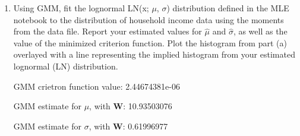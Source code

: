 \documentclass[letterpaper,12pt]{article}
\theoremstyle{definition}
\begin{document}
\begin{enumerate}
\begin{enumerate}
\item Using GMM, fit the lognormal LN(x; $\mu$, $\sigma$) distribution defined in the MLE notebook to the distribution of household income data using the moments from the data file. Report your estimated values for $\hat{\mu}$ and $\hat{\sigma}$, as well as the value of the minimized criterion function. Plot the histogram from part (a) overlayed with a line representing the implied histogram from your estimated lognormal (LN) distribution.
\par
\begin{figure}[H]\centering\captionsetup{width=4.0in}
\end{figure}
\par
GMM crietron function value: 2.44674381e-06 \par
GMM estimate for $\mu$, with $\textbf{W}$: 10.93503076\par
GMM estimate for $\sigma$, with $\textbf{W}$: 0.61996977 \par
\bigskip


\end{enumerate}
\end{enumerate}
\end{document}
